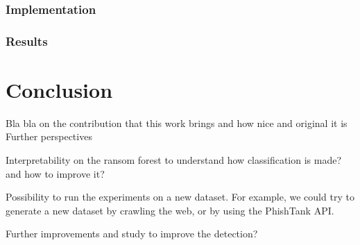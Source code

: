 \documentclass{article}
\begin{document}
    \subsubsection{Implementation}


    \subsubsection{Results}


    \section{Conclusion}\label{sec:conclusion}
    Bla bla on the contribution that this work brings and how nice and original it is
    Further perspectives

    Interpretability on the ransom forest to understand how classification is made? and how to improve it?

    Possibility to run the experiments on a new dataset.
    For example, we could try to generate a new dataset by crawling the web, or by using the PhishTank API.

    Further improvements and study to improve the detection?

    
    
\end{document}
